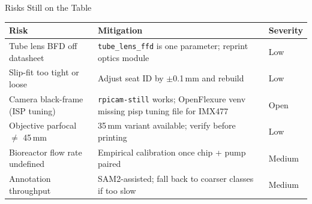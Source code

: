 \documentclass[aspectratio=169,11pt]{beamer}
\begin{document}
\begin{frame}{Risks Still on the Table}

  \footnotesize
  \begin{tabular}{@{}p{3.8cm}p{6.4cm}p{2.2cm}@{}}
    \toprule
    \textbf{Risk} & \textbf{Mitigation} & \textbf{Severity} \\
    \midrule
    Tube lens BFD off datasheet     & \texttt{tube\_lens\_ffd} is one parameter; reprint optics module & Low \\
    Slip-fit too tight or loose     & Adjust seat ID by $\pm$0.1\,mm and rebuild                       & Low \\
    Camera black-frame (ISP tuning) & \texttt{rpicam-still} works; OpenFlexure venv missing pisp tuning file for IMX477 & \alert{Open} \\
    Objective parfocal $\neq$ 45\,mm & 35\,mm variant available; verify before printing                 & Low \\
    Bioreactor flow rate undefined  & Empirical calibration once chip + pump paired                    & Medium \\
    Annotation throughput           & SAM2-assisted; fall back to coarser classes if too slow          & Medium \\
    \bottomrule
  \end{tabular}

\end{frame}
\end{document}
